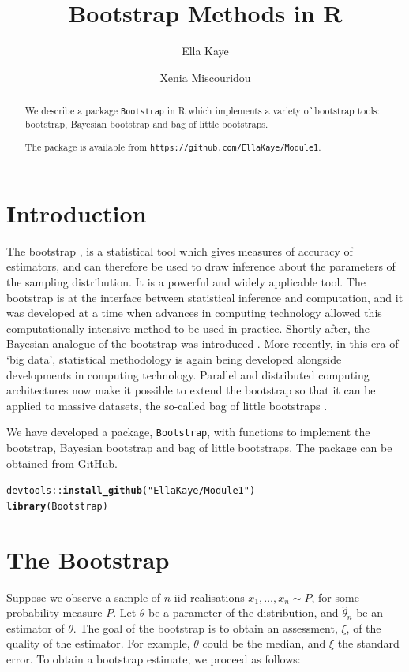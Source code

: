 \documentclass{article}\usepackage[]{graphicx}\usepackage[]{color}
\title{Bootstrap Methods in R}
\author{Ella Kaye \and Xenia Miscouridou}
\makeatletter
\newcommand{\hlstr}[1]{\textcolor[rgb]{0.192,0.494,0.8}{#1}}%
\newcommand{\hlopt}[1]{\textcolor[rgb]{0,0,0}{#1}}%
\newcommand{\hlstd}[1]{\textcolor[rgb]{0.345,0.345,0.345}{#1}}%
\newcommand{\hlkwd}[1]{\textcolor[rgb]{0.737,0.353,0.396}{\textbf{#1}}}%
\newenvironment{kframe}{%
 \def\at@end@of@kframe{}%
 \ifinner\ifhmode%
  \def\at@end@of@kframe{\end{minipage}}%
  \begin{minipage}{\columnwidth}%
 \fi\fi%
 \def\FrameCommand##1{\hskip\@totalleftmargin \hskip-\fboxsep
 \colorbox{shadecolor}{##1}\hskip-\fboxsep
     \hskip-\linewidth \hskip-\@totalleftmargin \hskip\columnwidth}%
 \MakeFramed {\advance\hsize-\width
   \@totalleftmargin\z@ \linewidth\hsize
   \@setminipage}}%
 {\par\unskip\endMakeFramed%
 \at@end@of@kframe}
\newenvironment{knitrout}{}{} %
\makeatother
\begin{document}
\maketitle

\begin{abstract}
We describe a package \texttt{Bootstrap} in R which implements a variety of bootstrap tools: bootstrap, Bayesian bootstrap and bag of little bootstraps.

The package is available from \texttt{https://github.com/EllaKaye/Module1}.
\end{abstract}

\section{Introduction}
The bootstrap \parencite{Efron1979}, is a statistical tool which gives measures of accuracy of estimators, and can therefore be used to draw inference about the parameters of the sampling distribution. It is a powerful and widely applicable tool. The bootstrap is at the interface between statistical inference and computation, and it was developed at a time when advances in computing technology allowed this computationally intensive method to be used in practice. Shortly after, the Bayesian analogue of the bootstrap was introduced \parencite{Rubin1981}. More recently, in this era of `big data', statistical methodology is again being developed alongside developments in computing technology. Parallel and distributed computing architectures now make it possible to extend the bootstrap so that it can be applied to massive datasets, the so-called bag of little bootstraps \parencite{Kleiner2014}.

We have developed a package, \texttt{Bootstrap}, with functions to implement the bootstrap, Bayesian bootstrap and bag of little bootstraps. The package can be obtained from GitHub.
\begin{knitrout}
\color{fgcolor}\begin{kframe}
\begin{alltt}
\hlstd{devtools}\hlopt{::}\hlkwd{install_github}\hlstd{(}\hlstr{"EllaKaye/Module1"}\hlstd{)}
\hlkwd{library}\hlstd{(Bootstrap)}
\end{alltt}
\end{kframe}
\end{knitrout}




\section{The Bootstrap}
Suppose we observe a sample of $n$ iid realisations  $x_1,\ldots, x_n \sim P$, for some probability measure $P$. Let $\theta$ be a parameter of the distribution, and $\hat\theta_n$ be an estimator of $\theta$. The goal of the bootstrap is to obtain an assessment, $\xi$, of the quality of the estimator. For example, $\theta$ could be the median, and $\xi$ the standard error. To obtain a bootstrap estimate, we proceed as follows:
\end{document}
